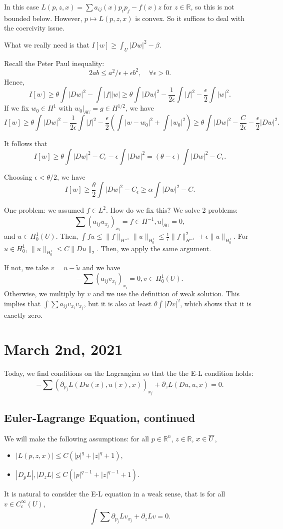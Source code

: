 \documentclass[12pt]{scrartcl}
\newcommand{\R}{\mathbb{R}}
\newcommand{\<}{\langle}
\renewcommand{\>}{\rangle}
\begin{document}
In this case $L(p, z, x) = \sum a_{ij}(x) p_i p_j - f(x)z$ for $z \in\R$, so this is not bounded below.   However, $p \mapsto L(p, z, x)$ is convex.  So it suffices to deal with the coercivity issue.  

What we really need is that $I[w] \ge \int _U |Dw|^2 - \beta$.  

Recall the Peter Paul inequality: 
$$2ab \le a^2/\epsilon + \epsilon b^2, \quad \forall \epsilon > 0.$$
Hence,
$$I[w] \ge \theta \int |Dw|^2 - \int |f| |w| \ge \theta \int |Dw|^2 - \frac{1}{2\epsilon }\int |f|^2 - \frac{\epsilon}{2} \int |w|^2.$$
If we fix $w_0 \in H^1$ with $w_0 \vert_{\partial U} = g \in H^{1/2}$, we have
$$I[w] \ge \theta \int |Dw|^2 - \frac{1}{2\epsilon}\int |f|^2 - \frac{\epsilon}{2}\left ( \int |w - w_0|^2 + \int |w_0|^2\right ) \ge \theta \int |Dw|^2 - \frac{C}{2\epsilon} - \frac{\epsilon}{2} |Dw|^2.$$


It follows that 
$$I[w] \ge \theta \int |Dw|^2 - C_\epsilon - \epsilon \int |Dw|^2 = (\theta - \epsilon) \int |Dw|^2 - C_\epsilon.$$

Choosing $\epsilon < \theta/2$, we have
$$I[w] \ge \frac{\theta}{2} \int |Dw|^2 - C_\epsilon \ge \alpha \int |Dw|^2 - C.$$

One problem: we assumed $f \in L^2$.  How do we fix this? We solve 2 problems:
$$\sum (a_{ij}u_{x_j})_{x_i} = f \in H^{-1}, u \vert_{\partial U} = 0,$$
and $u \in H_0^1(U)$.  Then, $\int fu \le \|f\|_{H^{-1}} \|u\|_{H_0^1} \le \frac{1}{\epsilon} \|f\|_{H^{-1}}^2 + \epsilon \|u\|_{H_0^1}$.  For $u \in H_0^1$, $\|u\|_{H_0^1} \le C \|Du\|_{2}$.  Then, we apply the same argument.

If not, we take $v = u - \tilde{u}$ and we have $$-\sum (a_{ij} v_{x_j})_{x_i} = 0, v\in H_0^1(U).$$  Otherwise, we multiply by $v$ and we use the definition of weak solution.  This implies that $\int \sum a_{ij} v_{x_i}v_{x_j}$, but it is also at least $\theta \int |Dv|^2$, which shows that it is exactly zero.
\pagebreak
\section{March 2nd, 2021}
Today, we find conditions on the Lagrangian so that the the E-L condition holds:
$$-\sum (\partial_{p_j}L(Du(x), u(x), x))_{x_j} + \partial_z L(Du, u, x) = 0.$$
\subsection{Euler-Lagrange Equation, continued}
We will make the following assumptions:  for all $p \in \R^n$, $z \in \R$, $x \in \overline U$,
\begin{itemize}
\item $|L(p, z, x)| \le C(|p|^q + |z|^q + 1)$,
\item $|D_pL|, |D_zL| \le C(|p|^{q-1} + |z|^{q-1} + 1)$.
\end{itemize}
It is natural to consider the E-L equation in a weak sense, that is for all $v \in C_c^\infty(U)$, 
$$\int \sum \partial_{p_j} L v_{x_j} + \partial_z L v = 0.$$
\end{document}
